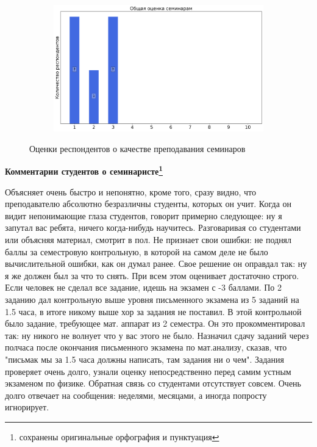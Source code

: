 \begin{figure}[H]
\begin{subfigure}[b]{0.45\textwidth}
			\end{subfigure}
			\begin{subfigure}[b]{0.45\textwidth}
				\centering
				\includegraphics[width=\textwidth]{images/1 course/Общая физика - механика/seminarists-marks-Вановский В.В.-3.png}
			\end{subfigure}	
			\caption{Оценки респондентов о качестве преподавания семинаров}
		\end{figure}

		\textbf{Комментарии студентов о семинаристе\protect\footnote{сохранены оригинальные орфография и пунктуация}}
        \begin{commentbox} 
            Объясняет очень быстро и непонятно, кроме того, сразу видно, что преподавателю абсолютно безразличны студенты, которых он учит. Когда он видит непонимающие глаза студентов, говорит примерно следующее: ну я запутал вас ребята, ничего когда-нибудь научитесь. Разговаривая со студентами или объясняя материал, смотрит в пол. Не признает свои ошибки: не поднял баллы за семестровую контрольную, в которой на самом деле не было вычислительной ошибки, как он думал ранее. Свое решение он оправдал так: ну я же должен был за что то снять. При всем этом оценивает достаточно строго. Если человек не сделал все задание, идешь на экзамен с -3 баллами. По 2 заданию  дал контрольную выше уровня письменного экзамена  из 5 заданий на 1.5 часа, в итоге никому выше хор за задания не поставил. В этой контрольной было задание, требующее мат. аппарат из 2 семестра. Он это прокомментировал так: ну никого не волнует что у вас этого не было. Назначил сдачу заданий через полчаса после окончания письменного экзамена по мат.анализу, сказав, что "письмак мы за 1.5 часа должны написать, там задания ни о чем". Задания проверяет очень долго, узнали оценку непосредственно перед самим устным экзаменом по физике. Обратная связь со студентами отсутствует совсем. Очень долго отвечает на сообщения: неделями, месяцами, а иногда попросту игнорирует.
        \end{commentbox} 
       
